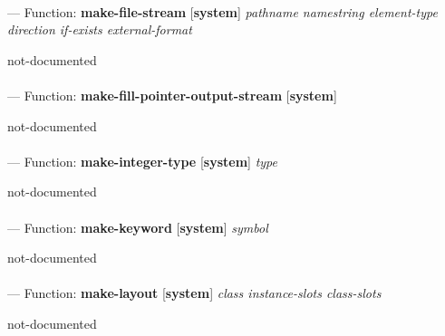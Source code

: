 \paragraph{}
\label{SYSTEM:MAKE-FILE-STREAM}
--- Function: \textbf{make-file-stream} [\textbf{system}] \textit{pathname namestring element-type direction if-exists external-format}

\begin{adjustwidth}{5em}{5em}
not-documented
\end{adjustwidth}

\paragraph{}
\label{SYSTEM:MAKE-FILL-POINTER-OUTPUT-STREAM}
--- Function: \textbf{make-fill-pointer-output-stream} [\textbf{system}] \textit{}

\begin{adjustwidth}{5em}{5em}
not-documented
\end{adjustwidth}

\paragraph{}
\label{SYSTEM:MAKE-INTEGER-TYPE}
--- Function: \textbf{make-integer-type} [\textbf{system}] \textit{type}

\begin{adjustwidth}{5em}{5em}
not-documented
\end{adjustwidth}

\paragraph{}
\label{SYSTEM:MAKE-KEYWORD}
--- Function: \textbf{make-keyword} [\textbf{system}] \textit{symbol}

\begin{adjustwidth}{5em}{5em}
not-documented
\end{adjustwidth}

\paragraph{}
\label{SYSTEM:MAKE-LAYOUT}
--- Function: \textbf{make-layout} [\textbf{system}] \textit{class instance-slots class-slots}

\begin{adjustwidth}{5em}{5em}
not-documented
\end{adjustwidth}

